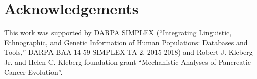 \documentclass[11pt]{article}
\begin{document}
\section{Acknowledgements}
This work was supported by DARPA SIMPLEX (``Integrating Linguistic, Ethnographic, and Genetic Information of Human Populations: Databases and Tools,'' DARPA-BAA-14-59 SIMPLEX TA-2, 2015-2018) and Robert J. Kleberg Jr. and Helen C. Kleberg foundation grant ``Mechanistic Analyses of Pancreatic Cancer Evolution''. 
\newpage

\end{document}
